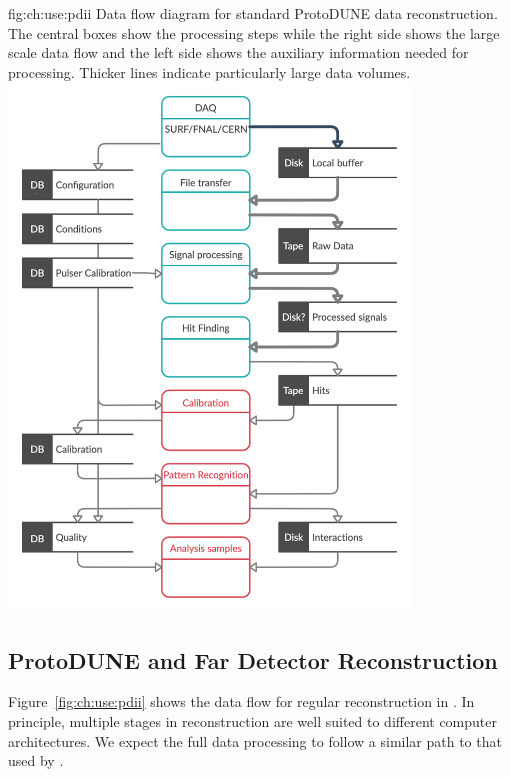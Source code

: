 \documentclass[../main-v1.tex]{subfiles}
\begin{document}
\begin{dunefigure}
{fig:ch:use:pdii}
{Data flow diagram for standard ProtoDUNE data reconstruction. The central boxes show the processing steps while the right side shows the large scale data flow  and the left side shows the auxiliary information needed for processing. Thicker lines indicate particularly large data volumes.}
\includegraphics[width=0.8\textwidth]{graphics/IntroFigures/Data_processing_FD_v3.png}
\end{dunefigure}

\subsection{ProtoDUNE and Far Detector Reconstruction}\label{sec:use:pdii}

Figure~\ref{fig:ch:use:pdii} shows the data flow for regular reconstruction in .  %
In principle, multiple stages in reconstruction are well suited to different computer architectures.  We expect the full  data processing to follow a similar path to that used by .  
\end{document}
